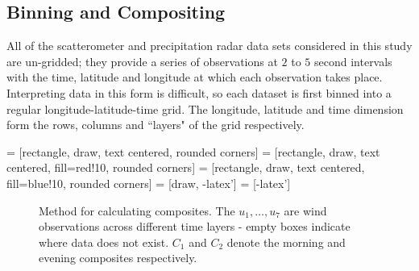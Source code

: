 \documentclass[12pt]{book}
\begin{document}
\subsection{Binning and Compositing}
\label{Sec:Binning}
All of the scatterometer and precipitation radar data sets considered in this study are un-gridded; they provide a series of observations at $2$ to $5$ second intervals with the time, latitude and longitude at which each observation takes place. Interpreting data in this form is difficult, so each dataset is first binned into a regular longitude-latitude-time grid. The longitude, latitude and time dimension form the rows, columns and ``layers" of the grid respectively.

 = [rectangle, draw, text centered, rounded corners]
 = [rectangle, draw, text centered, fill=red!10, rounded corners]
 = [rectangle, draw, text centered, fill=blue!10, rounded corners]
 = [draw, -latex']
 = [-latex']

\begin{figure}
\begin{center}
\caption{Method for calculating composites. The $u_1,\ldots,u_7$ are wind observations across different time layers - empty boxes indicate where data does not exist. $C_1$ and $C_2$ denote the morning and evening composites respectively.}
\label{Fig:method1}
\end{center}
\end{figure}
\end{document}
